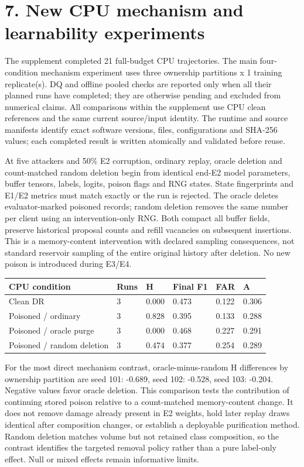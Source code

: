 \documentclass[
  10pt,
]{article}
\begin{document}
\hypertarget{new-cpu-mechanism-and-learnability-experiments}{%
\section{7. New CPU mechanism and learnability
experiments}\label{new-cpu-mechanism-and-learnability-experiments}}

The supplement completed 21 full-budget CPU trajectories. The main
four-condition mechanism experiment uses three ownership partitions x 1
training replicate(s). DQ and offline pooled checks are reported only
when all their planned runs have completed; they are otherwise pending
and excluded from numerical claims. All comparisons within the
supplement use CPU clean references and the same current source/input
identity. The runtime and source manifests identify exact software
versions, files, configurations and SHA-256 values; each completed
result is written atomically and validated before reuse.

At five attackers and 50\% E2 corruption, ordinary replay, oracle
deletion and count-matched random deletion begin from identical end-E2
model parameters, buffer tensors, labels, logits, poison flags and RNG
states. State fingerprints and E1/E2 metrics must match exactly or the
run is rejected. The oracle deletes evaluator-marked poisoned records;
random deletion removes the same number per client using an
intervention-only RNG. Both compact all buffer fields, preserve
historical proposal counts and refill vacancies on subsequent
insertions. This is a memory-content intervention with declared sampling
consequences, not standard reservoir sampling of the entire original
history after deletion. No new poison is introduced during E3/E4.

\begin{longtable}[]{@{}llllll@{}}
\toprule
CPU condition & Runs & H & Final F1 & FAR & A \\
\midrule
\endhead
Clean DR & 3 & 0.000 & 0.473 & 0.122 & 0.306 \\
Poisoned / ordinary & 3 & 0.828 & 0.395 & 0.133 & 0.288 \\
Poisoned / oracle purge & 3 & 0.000 & 0.468 & 0.227 & 0.291 \\
Poisoned / random deletion & 3 & 0.474 & 0.377 & 0.254 & 0.289 \\
\bottomrule
\end{longtable}

For the most direct mechanism contrast, oracle-minus-random H
differences by ownership partition are seed 101: -0.689, seed 102:
-0.528, seed 103: -0.204. Negative values favor oracle deletion. This
comparison tests the contribution of continuing stored poison relative
to a count-matched memory-content change. It does not remove damage
already present in E2 weights, hold later replay draws identical after
composition changes, or establish a deployable purification method.
Random deletion matches volume but not retained class composition, so
the contrast identifies the targeted removal policy rather than a pure
label-only effect. Null or mixed effects remain informative limits.
\end{document}
